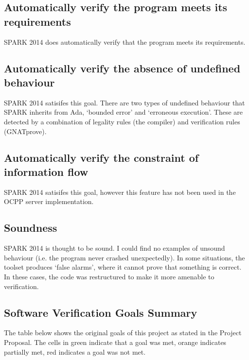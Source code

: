 \documentclass[12pt,openany,a4paper]{book}
\begin{document}
\subsection{Automatically verify the program meets its requirements}
SPARK 2014 does automatically verify that the program meets its requirements.

\subsection{Automatically verify the absence of undefined behaviour}
SPARK 2014 satisifes this goal. There are two types of undefined behaviour that SPARK inherits from Ada, `bounded error' and `erroneous execution'. These are detected by a combination of legality rules (the compiler) and verification rules (GNATprove).

\subsection{Automatically verify the constraint of information flow}
SPARK 2014 satisifes this goal, however this feature has not been used in the OCPP server implementation. 

\subsection{Soundness}
SPARK 2014 is thought to be sound. I could find no examples of unsound behaviour (i.e. the program never crashed unexpectedly). In some situations, the toolset produces `false alarms', where it cannot prove that something is correct. In these cases, the code was restructured to make it more amenable to verification.

\subsection{Software Verification Goals Summary}

The table below shows the original goals of this project as stated in the Project Proposal. The cells in green indicate that a goal was met, orange indicates partially met, red indicates a goal was not met.
\end{document}
